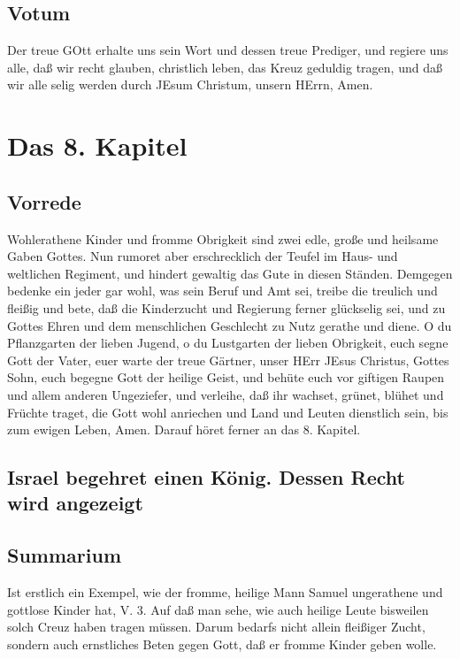 \section{Votum}

Der treue GOtt erhalte uns sein Wort und dessen treue Prediger, und regiere uns alle, daß wir recht glauben, christlich leben, das Kreuz geduldig tragen, und daß wir alle selig werden durch JEsum Christum, unsern HErrn, Amen.

\chapter{Das 8. Kapitel}

\section{Vorrede}

Wohlerathene Kinder und fromme Obrigkeit sind zwei edle, große und heilsame Gaben Gottes. Nun rumoret aber erschrecklich der Teufel im Haus- und weltlichen Regiment, und hindert gewaltig das Gute in diesen Ständen. Demgegen bedenke ein jeder gar wohl, was sein Beruf und Amt sei, treibe die treulich und fleißig und bete, daß die Kinderzucht und Regierung ferner glückselig sei, und zu Gottes Ehren und dem menschlichen Geschlecht zu Nutz gerathe und diene. O du Pflanzgarten der lieben Jugend, o du Lustgarten der lieben Obrigkeit, euch segne Gott der Vater, euer warte der treue Gärtner, unser HErr JEsus Christus, Gottes Sohn, euch begegne Gott der heilige Geist, und behüte euch vor giftigen Raupen und allem anderen Ungeziefer, und verleihe, daß ihr wachset, grünet, blühet und Früchte traget, die Gott wohl anriechen und Land und Leuten dienstlich sein, bis zum ewigen Leben, Amen. Darauf höret ferner an das 8. Kapitel.

\section{Israel begehret einen König. Dessen Recht wird angezeigt}

\section{Summarium}

Ist erstlich ein Exempel, wie der fromme, heilige Mann Samuel ungerathene und gottlose Kinder hat, V. 3. Auf daß man sehe, wie auch heilige Leute bisweilen solch Creuz haben tragen müssen. Darum bedarfs nicht allein fleißiger Zucht, sondern auch ernstliches Beten gegen Gott, daß er fromme Kinder geben wolle.

